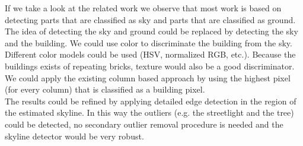 





If we take a look at the related work we observe that most work is based on
detecting parts that are classified as sky and parts that are classified as
ground. The idea of detecting the sky and ground could be replaced by detecting
the sky and the building. We could use color to discriminate the building from
the sky. Different color models could be used (HSV, normalized RGB, etc.).
Because the buildings exists of repeating bricks, texture would also be a good
discriminator. We could apply the existing column based approach by using the
highest pixel (for every column) that is classified as a building pixel.\\

The results could be refined by applying detailed edge detection in the region of
the estimated skyline. In this way the outliers (e.g. the streetlight and the
tree) could be detected, no secondary outlier removal procedure is needed and
the skyline detector would be very robust.




